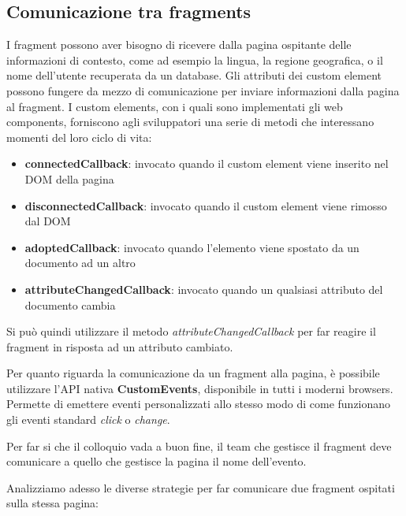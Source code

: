 \subsection*{Comunicazione tra fragments}
I fragment possono aver bisogno di ricevere dalla pagina 
ospitante delle informazioni di contesto, come ad esempio la lingua, 
la regione geografica, o il nome dell'utente recuperata da un database.
Gli attributi dei custom element possono fungere da mezzo di comunicazione per inviare
informazioni dalla pagina al fragment.
I custom elements, con i quali sono implementati gli web components, forniscono agli sviluppatori 
una serie di metodi che interessano momenti del loro ciclo di vita:
\begin{itemize}
    \item \textbf{connectedCallback}: invocato quando il custom element viene inserito nel DOM della pagina 
    \item \textbf{disconnectedCallback}: invocato quando il custom element viene rimosso dal DOM
    \item \textbf{adoptedCallback}: invocato quando l'elemento viene spostato da un documento ad un altro
    \item \textbf{attributeChangedCallback}: invocato quando un qualsiasi attributo del documento cambia
\end{itemize}

Si può quindi utilizzare il metodo \emph{attributeChangedCallback} per far reagire il fragment in risposta ad un
attributo cambiato.

\linebreak

Per quanto riguarda la comunicazione da un fragment alla pagina, è possibile utilizzare 
l'API nativa \textbf{CustomEvents}, disponibile in tutti i moderni browsers.
Permette di emettere eventi personalizzati allo stesso modo di come funzionano gli eventi standard \emph{click} o \emph{change}.

Per far si che il colloquio vada a buon fine, il team che gestisce il fragment deve comunicare a quello che gestisce la pagina
il nome dell'evento.

\pagebreak

Analizziamo adesso le diverse strategie per far comunicare due fragment ospitati sulla stessa pagina:

